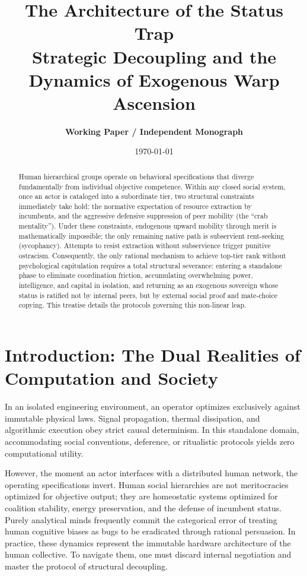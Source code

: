 \documentclass[11pt,a4paper]{article}
\title{\LARGE\bfseries The Architecture of the Status Trap\\
\large Strategic Decoupling and the Dynamics of Exogenous Warp Ascension}
\author{\textbf{Working Paper / Independent Monograph}}
\date{\today}
\begin{document}
\maketitle

\begin{abstract}
Human hierarchical groups operate on behavioral specifications that diverge fundamentally from individual objective competence. Within any closed social system, once an actor is cataloged into a subordinate tier, two structural constraints immediately take hold: the normative expectation of resource extraction by incumbents, and the aggressive defensive suppression of peer mobility (the ``crab mentality''). Under these constraints, endogenous upward mobility through merit is mathematically impossible; the only remaining native path is subservient rent-seeking (sycophancy). Attempts to resist extraction without subservience trigger punitive ostracism. Consequently, the only rational mechanism to achieve top-tier rank without psychological capitulation requires a total structural severance: entering a standalone phase to eliminate coordination friction, accumulating overwhelming power, intelligence, and capital in isolation, and returning as an exogenous sovereign whose status is ratified not by internal peers, but by external social proof and mate-choice copying. This treatise details the protocols governing this non-linear leap.
\end{abstract}

\section{Introduction: The Dual Realities of Computation and Society}
In an isolated engineering environment, an operator optimizes exclusively against immutable physical laws. Signal propagation, thermal dissipation, and algorithmic execution obey strict causal determinism. In this standalone domain, accommodating social conventions, deference, or ritualistic protocols yields zero computational utility.

However, the moment an actor interfaces with a distributed human network, the operating specifications invert. Human social hierarchies are not meritocracies optimized for objective output; they are homeostatic systems optimized for coalition stability, energy preservation, and the defense of incumbent status. Purely analytical minds frequently commit the categorical error of treating human cognitive biases as bugs to be eradicated through rational persuasion. In practice, these dynamics represent the immutable hardware architecture of the human collective. To navigate them, one must discard internal negotiation and master the protocol of structural decoupling.
\end{document}
